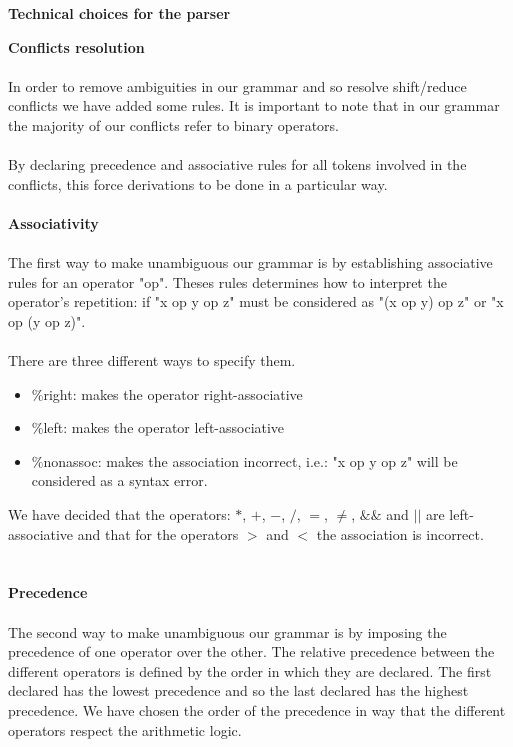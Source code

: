 \documentclass[11pt]{report}
\begin{document}
\newpage
\centerline{\textbf{\Huge Technical choices for the parser}}
\vspace*{3pt}
\vspace*{10pt}
\tabto{0cm} {\Large \textbf{Conflicts resolution}}
\\ \\ 
\tabto{1cm} In order to remove ambiguities in our grammar and so resolve shift/reduce conflicts we have added some rules. It is important to note that in our grammar the majority of our conflicts refer to binary operators.  \\ \\
By declaring precedence and associative rules for all tokens involved in the conflicts, this force derivations to be done in a particular way.
\\ \\ 
\tabto{2cm} \textbf{Associativity}
\\ \\
\tabto{1cm} The first way to make unambiguous our grammar is by establishing associative rules for an operator "op". Theses rules determines how to interpret the operator's repetition: if "x op y op z" must be considered as "(x op y) op z" or "x op (y op z)". \\ \\
There are three different ways to specify them. 
\begin{itemize}
\item \%right:  makes the operator right-associative
\item \%left: makes the operator left-associative
\item \%nonassoc: makes the association incorrect, i.e.: "x op y op z" will be considered as a syntax error.
\end{itemize}
We have decided that the operators: $*$, $+$, $-$, $/$, $=$, $\ne$, $\&\&$ and $||$ are left-associative and that for the operators $>$ and $<$ the association is incorrect.
\\ \\ \\
\tabto{2cm} \textbf{Precedence}
\\ \\
\tabto{1cm} The second way to make unambiguous our grammar is by imposing the precedence of one operator over the other. The relative precedence between the different operators is defined by the order in which they are declared. The first declared has the lowest precedence and so the last declared has the highest precedence. We have chosen the order of the precedence in way that the different operators respect the arithmetic logic.
\end{document}
